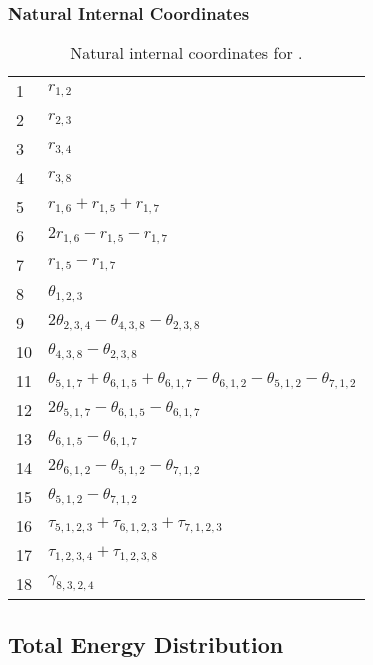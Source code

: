 \documentclass[10pt,oneside]{article}
\begin{document}
\begin{table}[h!]
\subsubsection*{Natural Internal Coordinates}
\centering
\caption{Natural internal coordinates for .}
\small
\begin{tabular}{ll}
\toprule
  1   & $r_{1,2}$ \\
  2   & $r_{2,3}$ \\
  3   & $r_{3,4}$ \\
  4   & $r_{3,8}$ \\
  5   & $r_{1,6} + r_{1,5} + r_{1,7}$ \\
  6   & $2r_{1,6} - r_{1,5} - r_{1,7}$ \\
  7   & $r_{1,5} - r_{1,7}$ \\
  8   & $\theta_{1,2,3}$ \\
  9   & $2\theta_{2,3,4} - \theta_{4,3,8} - \theta_{2,3,8}$ \\
  10  & $\theta_{4,3,8} - \theta_{2,3,8}$ \\
  11  & $\theta_{5,1,7} + \theta_{6,1,5} + \theta_{6,1,7} - \theta_{6,1,2} - \theta_{5,1,2} - \theta_{7,1,2}$ \\
  12  & $2\theta_{5,1,7} - \theta_{6,1,5} - \theta_{6,1,7}$ \\
  13  & $\theta_{6,1,5} - \theta_{6,1,7}$ \\
  14  & $2\theta_{6,1,2} - \theta_{5,1,2} - \theta_{7,1,2}$ \\
  15  & $\theta_{5,1,2} - \theta_{7,1,2}$ \\
  16  & $\tau_{5,1,2,3} + \tau_{6,1,2,3} + \tau_{7,1,2,3}$ \\
  17  & $\tau_{1,2,3,4} + \tau_{1,2,3,8}$ \\
  18  & $\gamma_{8,3,2,4}$ \\
\bottomrule
\end{tabular}
\end{table}

\begin{table}
\subsection*{Total Energy Distribution}
\centering\end{table}

\clearpage

\subsection{}
\end{document}
